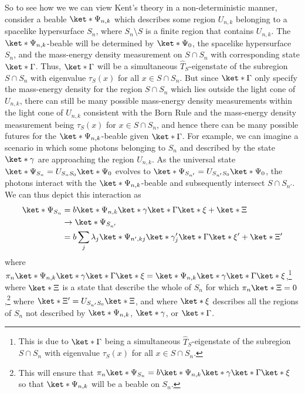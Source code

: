 So to see how we we can view Kent's theory in a non-deterministic manner, consider a beable $\ket*{\Psi_{n,k}}$ which describes some region $U_{n,k}$ belonging to a spacelike hypersurface $S_n$, where $S_n\setminus S$ is a finite region that contains $U_{n,k}$. The $\ket*{\Psi_{n,k}}$-beable will be determined by $\ket*{\Psi_0}$, the spacelike hypersurface $S_n$, and the mass-energy density measurement on $S\cap S_n$ with corresponding state $\ket*{\Gamma}$. Thus, $\ket*{\Gamma}$  will be a simultaneous $\hat{T}_S$-eigenstate of the subregion $S\cap S_n$ with eigenvalue $\tau_S(x)$ for all $x\in S\cap S_n$. But since $\ket*{\Gamma}$ only specify the mass-energy density for the region  $S\cap S_n$ which lies outside the light cone of $U_{n,k}$, there can still be many possible mass-energy density measurements within the light cone of $U_{n,k}$ consistent with the Born Rule and the mass-energy density measurement being $\tau_S(x)$ for $x\in S\cap S_n$, and hence there can be many possible futures for the $\ket*{\Psi_{n,k}}$-beable given $\ket*{\Gamma}$. For example, we can imagine a scenario in which some photons belonging to $S_n$ and described by the state $\ket*{\gamma}$ are approaching the region $U_{n,k}$. As the universal state $\ket*{\Psi_{S_n}}=U_{S_nS_0}\ket*{\Psi_0}$ evolves to $\ket*{\Psi_{S_{n'}}}=U_{S_{n'}S_0}\ket*{\Psi_0}$, the photons interact with the $\ket*{\Psi_{n,k}}$-beable and subsequently intersect $S\cap S_{n'}$. We can thus depict this interaction as
\begin{equation}
\begin{split}
\ket*{\Psi_{S_n}}&= b\ket*{\Psi_{n,k}}\ket*{\gamma}\ket*{\Gamma}\ket*{\xi}+\ket*{\Xi}\\
&\rightarrow \ket*{\Psi_{S_{n'}}}\\
&=b\sum_j \lambda_j \ket*{\Psi_{n', kj}}\ket*{\gamma_{j}'}\ket*{\Gamma}\ket*{\xi'}+\ket*{\Xi'}
\end{split}
\end{equation}
where $\pi_n\ket*{\Psi_{n,k}}\ket*{\gamma}\ket*{\Gamma}\ket*{\xi}=\ket*{\Psi_{n,k}}\ket*{\gamma}\ket*{\Gamma}\ket*{\xi}$,\footnote{This is due to  $\ket*{\Gamma}$ being a simultaneous $\hat{T}_S$-eigenstate of the subregion $S\cap S_n$ with eigenvalue $\tau_S(x)$ for all $x\in S\cap S_n$.} where $\ket*{\Xi}$ is a state that describe the whole of $S_n$ for which $\pi_n\ket*{\Xi}=0$,\footnote{This will ensure that $\pi_n\ket*{\Psi_{S_n}}=b\ket*{\Psi_{n,k}}\ket*{\gamma}\ket*{\Gamma}\ket*{\xi}$ so that $\ket*{\Psi_{n,k}}$ will be a beable on $S_n$.} where $\ket*{\Xi'}=U_{S_{n'}S_0}\ket*{\Xi}$, and where $\ket*{\xi}$ describes all the regions of $S_n$ not described by $\ket*{\Psi_{n,k}}$, $\ket*{\gamma}$, or $\ket*{\Gamma}$. 
